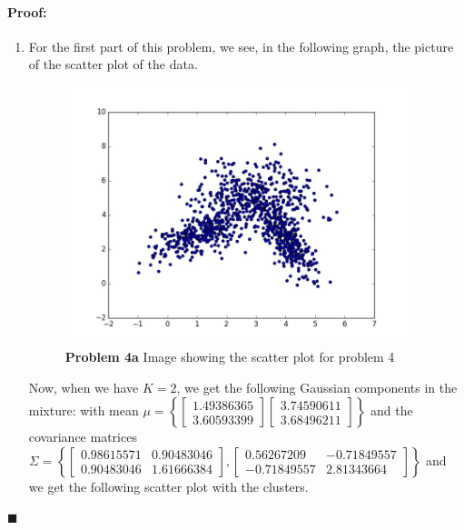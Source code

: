 \documentclass[12pt]{article}
\newenvironment{proof}{\paragraph{Proof: }}{\hfill$\blacksquare$}
\begin{document}
\begin{proof}

\begin{enumerate}

\item For the first part of this problem, we see, in the following graph, the picture of the scatter plot of the data.

\begin{figure}[!htbp]
\centering
\includegraphics[width = 10cm]{prob4_scatter.jpg}
\caption{\textbf{Problem 4a} Image showing the scatter plot for problem 4}
\end{figure}

Now, when we have $K = 2$, we get the following Gaussian components in the mixture: with mean $\mu = \left\{ \left[ \begin{matrix} 1.49386365 \\3.60593399 \end{matrix} \right] \left[ \begin{matrix} 3.74590611 \\ 3.68496211 \end{matrix}\right] \right\}$ and the covariance matrices $\Sigma = \left\{ \left[ \begin{matrix} 0.98615571 & 0.90483046 \\  0.90483046 & 1.61666384 \end{matrix} \right], \left[ \begin{matrix} 0.56267209 & -0.71849557 \\  -0.71849557 & 2.81343664 \end{matrix} \right] \right\}$ and we get the following scatter plot with the clusters. \\


\end{enumerate}
\end{proof}
\end{document}
